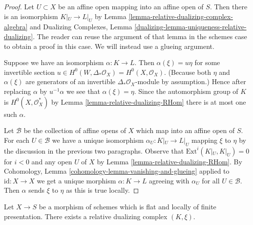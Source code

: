 \begin{proof}
Let $U \subset X$ be an affine open mapping into an
affine open of $S$. Then there is an isomorphism
$K|_U \to L|_U$ by Lemma \ref{lemma-relative-dualizing-complex-algebra} and
Dualizing Complexes, Lemma
\ref{dualizing-lemma-uniqueness-relative-dualizing}.
The reader can reuse the argument of that lemma
in the schemes case to obtain a proof in this case.
We will instead use a glueing argument.

\medskip\noindent
Suppose we have an isomorphism $\alpha : K \to L$.
Then $\alpha(\xi) = u \eta$ for some invertible section
$u \in H^0(W, \Delta_*\mathcal{O}_X) = H^0(X, \mathcal{O}_X)$.
(Because both $\eta$ and $\alpha(\xi)$ are generators
of an invertible $\Delta_*\mathcal{O}_X$-module by assumption.)
Hence after replacing $\alpha$ by $u^{-1}\alpha$
we see that $\alpha(\xi) = \eta$.
Since the automorphism group of
$K$ is $H^0(X, \mathcal{O}_X^*)$ by Lemma \ref{lemma-relative-dualizing-RHom}
there is at most one such $\alpha$.

\medskip\noindent
Let $\mathcal{B}$ be the collection of affine opens of
$X$ which map into an affine open of $S$. For each $U \in \mathcal{B}$
we have a unique isomorphism $\alpha_U : K|_U \to L|_U$
mapping $\xi$ to $\eta$ by the discussion in the previous
two paragraphs.
Observe that $\text{Ext}^i(K|_U, K|_U) = 0$ for $i < 0$
and any open $U$ of $X$ by Lemma \ref{lemma-relative-dualizing-RHom}.
By Cohomology, Lemma \ref{cohomology-lemma-vanishing-and-glueing}
applied to $\text{id} : X \to X$ we get a unique morphism
$\alpha : K \to L$ agreeing
with $\alpha_U$ for all $U \in \mathcal{B}$.
Then $\alpha$ sends $\xi$ to $\eta$ as this is true locally.
\end{proof}

\begin{lemma}
\label{lemma-existence-relative-dualizing}
Let $X \to S$ be a morphism of schemes which is
flat and locally of finite presentation.
There exists a relative dualizing complex $(K, \xi)$.
\end{lemma}

